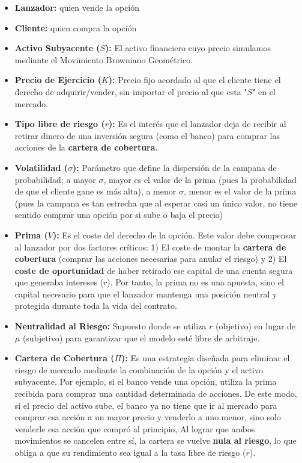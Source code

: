 \documentclass[11pt]{article}
\newcommand{\comillas}[1]{"#1"} %
\begin{document}
	\begin{itemize}
		\item \textbf{Lanzador:} quien vende la opción
		
		\item \textbf{Cliente:} quien compra la opción
		
		\item \textbf{Activo Subyacente ($S$):} El activo financiero cuyo precio simulamos mediante el Movimiento Browniano Geométrico.
		
		\item \textbf{Precio de Ejercicio ($K$):} Precio fijo acordado al que el cliente tiene el derecho de adquirir/vender, sin importar el precio al que esta \comillas{$S$} en el mercado.
		
		\item \textbf{Tipo libre de riesgo ($r$):} Es el interés que el lanzador deja de recibir al retirar dinero de una inversión segura (como el banco) para comprar las acciones de la \textbf{cartera de cobertura}.
		
		\item \textbf{Volatilidad ($\sigma$):} Parámetro que define la dispersión de la campana de probabilidad; a mayor $\sigma$, mayor es el valor de la prima (pues la probabilidad de que el cliente gane es más alta), a menor $\sigma$, menor es el valor de la prima (pues la campana es tan estrecha que al esperar casi un único valor, no tiene sentido comprar una opción por si sube o baja el precio)
		
		\item \textbf{Prima ($V$):} Es el coste del derecho de la opción. Este valor debe compensar al lanzador por dos factores críticos: 1) El coste de montar la \textbf{cartera de cobertura} (comprar las acciones necesarias para anular el riesgo) y 2) El \textbf{coste de oportunidad} de haber retirado ese capital de una cuenta segura que generaba intereses ($r$). Por tanto, la prima no es una apuesta, sino el capital necesario para que el lanzador mantenga una posición neutral y protegida durante toda la vida del contrato.
		
		\item \textbf{Neutralidad al Riesgo:} Supuesto donde se utiliza $r$ (objetivo) en lugar de $\mu$ (subjetivo) para garantizar que el modelo esté libre de arbitraje.
		
		\item \textbf{Cartera de Cobertura ($\Pi$):} Es una estrategia diseñada para eliminar el riesgo de mercado mediante la combinación de la opción y el activo subyacente. Por ejemplo, si el banco vende una opción, utiliza la prima recibida para comprar una cantidad determinada de acciones. De este modo, si el precio del activo sube, el banco ya no tiene que ir al mercado para comprar esa acción a un mayor precio y venderlo a uno menor, sino solo venderle esa acción que compró al principio, Al lograr que ambos movimientos se cancelen entre sí, la cartera se vuelve \textbf{nula al riesgo}, lo que obliga a que su rendimiento sea igual a la tasa libre de riesgo ($r$).
		

\end{itemize}
\end{document}
